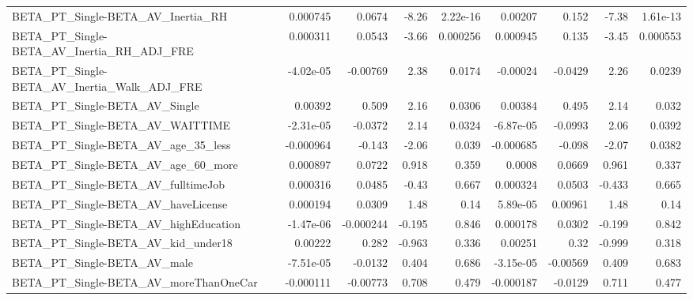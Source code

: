 \begin{tabular}{lrrrrrrrr}
BETA\_PT\_Single-BETA\_AV\_Inertia\_RH                  &    0.000745 &       0.0674 &    -8.26 & 2.22e-16 &    0.00207 &       0.152 &        -7.38 &      1.61e-13 \\
BETA\_PT\_Single-BETA\_AV\_Inertia\_RH\_ADJ\_FRE          &    0.000311 &       0.0543 &    -3.66 & 0.000256 &   0.000945 &       0.135 &        -3.45 &      0.000553 \\
BETA\_PT\_Single-BETA\_AV\_Inertia\_Walk\_ADJ\_FRE        &   -4.02e-05 &     -0.00769 &     2.38 &   0.0174 &   -0.00024 &     -0.0429 &         2.26 &        0.0239 \\
BETA\_PT\_Single-BETA\_AV\_Single                      &     0.00392 &        0.509 &     2.16 &   0.0306 &    0.00384 &       0.495 &         2.14 &         0.032 \\
BETA\_PT\_Single-BETA\_AV\_WAITTIME                    &   -2.31e-05 &      -0.0372 &     2.14 &   0.0324 &  -6.87e-05 &     -0.0993 &         2.06 &        0.0392 \\
BETA\_PT\_Single-BETA\_AV\_age\_35\_less                 &   -0.000964 &       -0.143 &    -2.06 &    0.039 &  -0.000685 &      -0.098 &        -2.07 &        0.0382 \\
BETA\_PT\_Single-BETA\_AV\_age\_60\_more                 &    0.000897 &       0.0722 &    0.918 &    0.359 &     0.0008 &      0.0669 &        0.961 &         0.337 \\
BETA\_PT\_Single-BETA\_AV\_fulltimeJob                 &    0.000316 &       0.0485 &    -0.43 &    0.667 &   0.000324 &      0.0503 &       -0.433 &         0.665 \\
BETA\_PT\_Single-BETA\_AV\_haveLicense                 &    0.000194 &       0.0309 &     1.48 &     0.14 &   5.89e-05 &     0.00961 &         1.48 &          0.14 \\
BETA\_PT\_Single-BETA\_AV\_highEducation               &   -1.47e-06 &    -0.000244 &   -0.195 &    0.846 &   0.000178 &      0.0302 &       -0.199 &         0.842 \\
BETA\_PT\_Single-BETA\_AV\_kid\_under18                 &     0.00222 &        0.282 &   -0.963 &    0.336 &    0.00251 &        0.32 &       -0.999 &         0.318 \\
BETA\_PT\_Single-BETA\_AV\_male                        &   -7.51e-05 &      -0.0132 &    0.404 &    0.686 &  -3.15e-05 &    -0.00569 &        0.409 &         0.683 \\
BETA\_PT\_Single-BETA\_AV\_moreThanOneCar              &   -0.000111 &     -0.00773 &    0.708 &    0.479 &  -0.000187 &     -0.0129 &        0.711 &         0.477 \\

\end{tabular}
